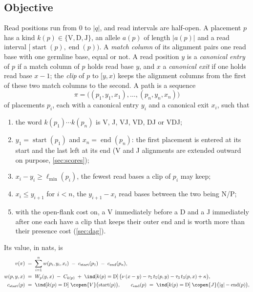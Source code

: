 \documentclass[11pt,a4paper]{article}
\begin{document}
\subsection{Objective}
\label{sec:objective}

Read positions run from $0$ to $|q|$, and read intervals are half-open. A
placement $p$ has a kind $k(p)\in\{\mathrm V,\mathrm D,\mathrm J\}$, an
allele $a(p)$ of length $|a(p)|$ and a read interval
$[\operatorname{start}(p),\operatorname{end}(p))$. A \emph{match column} of
its alignment pairs one read base with one germline base, equal or not. A
read position $y$ is a \emph{canonical entry} of $p$ if a match column of $p$
holds read base $y$, and $x$ a \emph{canonical exit} if one holds read base
$x-1$; the \emph{clip} of $p$ to $[y,x)$ keeps the alignment columns from the
first of these two match columns to the second. A path is a sequence
\begin{equation*}
  \pi=\bigl((p_1,y_1,x_1),\dots,(p_n,y_n,x_n)\bigr)
\end{equation*}
of placements $p_i$, each with a canonical entry $y_i$ and a canonical exit
$x_i$, such that
\begin{enumerate}
  \item the word $k(p_1)\cdots k(p_n)$ is V, J, VJ, VD, DJ or VDJ;
  \item $y_1=\operatorname{start}(p_1)$ and $x_n=\operatorname{end}(p_n)$:
    the first placement is entered at its start and the last left at its
    end (V and J alignments are extended outward on purpose,
    \cref{sec:scores});
  \item $x_i-y_i\ge\ell_{\min}(p_i)$, the fewest read bases a clip of $p_i$
    may keep;
  \item $x_i\le y_{i+1}$ for $i<n$, the $y_{i+1}-x_i$ read bases between the
    two being N/P;
  \item with the open-flank cost on, a V immediately before a D and a J
    immediately after one each have a clip that keeps their outer end and is
    worth more than their presence cost (\cref{sec:dag}).
\end{enumerate}
Its value, in nats, is
\begin{equation}
\begin{aligned}
  v(\pi) \;&=\; \sum_{i=1}^{n} w(p_i,y_i,x_i)
     \;-\; c_{\text{start}}(p_1) \;-\; c_{\text{end}}(p_n),\\
  w(p,y,x) \;&=\; W_p(y,x) \;-\; C_{k(p)}
     \;+\; \ind[k(p)=\mathrm D]\,\bigl(\nu\,(x-y) - \tau_5\,t_5(p,y) - \tau_3\,t_3(p,x) + \kappa\bigr),\\
  c_{\text{start}}(p) \;&=\; \ind[k(p)=\mathrm D]\;\copen{V}\bigl(\operatorname{start}(p)\bigr),
  \qquad
  c_{\text{end}}(p) \;=\; \ind[k(p)=\mathrm D]\;\copen{J}\bigl(|q|-\operatorname{end}(p)\bigr),
\end{aligned}
\label{eq:objective}
\end{equation}
\end{document}
